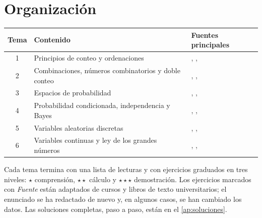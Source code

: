 \documentclass[11pt,a4paper,twoside,openany]{book}
\begin{document}
\section*{Organización}
\begin{center}
\begin{tabular}{@{}cll@{}}
\toprule
Tema & Contenido & Fuentes principales \\
\midrule
1 & Principios de conteo y ordenaciones & \cite{mcs}, \cite{ross}, \cite{bh} \\
2 & Combinaciones, números combinatorios y doble conteo & \cite{mcs}, \cite{bh}, \cite{stat110} \\
3 & Espacios de probabilidad & \cite{bt}, \cite{ross}, \cite{mcs} \\
4 & Probabilidad condicionada, independencia y Bayes & \cite{bh}, \cite{bt}, \cite{mcs} \\
5 & Variables aleatorias discretas & \cite{bh}, \cite{bt}, \cite{ross} \\
6 & Variables continuas y ley de los grandes números & \cite{bh}, \cite{ross}, \cite{gs} \\
\bottomrule
\end{tabular}
\end{center}

Cada tema termina con una lista de lecturas y con ejercicios graduados en tres niveles: $\star$ comprensión, $\star\star$ cálculo y $\star\star\star$ demostración. Los ejercicios marcados con \emph{Fuente} están adaptados de cursos y libros de texto universitarios; el enunciado se ha redactado de nuevo y, en algunos casos, se han cambiado los datos. Las soluciones completas, paso a paso, están en el \cref{ap:soluciones}.
\end{document}
